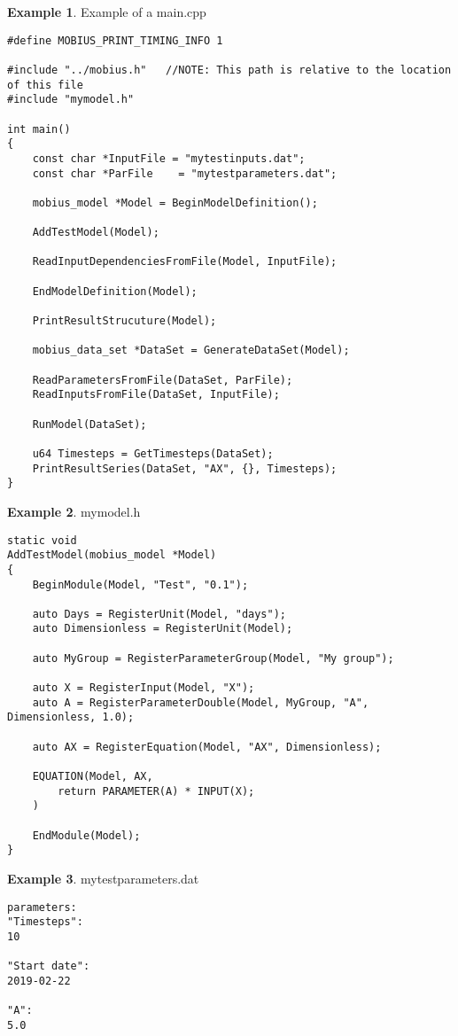 \documentclass[11pt]{article}
\theoremstyle{definition}
\newtheorem{myexample}{Example}
\newenvironment{example}%
  {\begin{lrbox}{\examplebox}%
   \begin{minipage}{\dimexpr\linewidth-2\fboxsep}
   \begin{myexample}}%
  {\end{myexample}%
   \end{minipage}%
   \end{lrbox}%
   \begin{trivlist}
     \item[]\colorbox{silver}{\usebox\examplebox}
   \end{trivlist}}
\begin{document}
\begin{example}\label{ex:examplemain}
Example of a main.cpp
\begin{lstlisting}[style=mycpp]
#define MOBIUS_PRINT_TIMING_INFO 1

#include "../mobius.h"   //NOTE: This path is relative to the location of this file
#include "mymodel.h"

int main()
{
	const char *InputFile = "mytestinputs.dat";
	const char *ParFile    = "mytestparameters.dat";

	mobius_model *Model = BeginModelDefinition();
	
	AddTestModel(Model);
	
	ReadInputDependenciesFromFile(Model, InputFile);

	EndModelDefinition(Model);

	PrintResultStrucuture(Model);

	mobius_data_set *DataSet = GenerateDataSet(Model);

	ReadParametersFromFile(DataSet, ParFile);
	ReadInputsFromFile(DataSet, InputFile);

	RunModel(DataSet);

	u64 Timesteps = GetTimesteps(DataSet);
	PrintResultSeries(DataSet, "AX", {}, Timesteps);
}

\end{lstlisting}
\end{example}

\begin{example}
mymodel.h
\begin{lstlisting}[style=mycpp]
static void
AddTestModel(mobius_model *Model)
{
	BeginModule(Model, "Test", "0.1");

	auto Days = RegisterUnit(Model, "days");
	auto Dimensionless = RegisterUnit(Model);

	auto MyGroup = RegisterParameterGroup(Model, "My group");

	auto X = RegisterInput(Model, "X");
	auto A = RegisterParameterDouble(Model, MyGroup, "A", Dimensionless, 1.0);

	auto AX = RegisterEquation(Model, "AX", Dimensionless);

	EQUATION(Model, AX,
		return PARAMETER(A) * INPUT(X);
	)

	EndModule(Model);
}
\end{lstlisting}
\end{example}

\begin{example}
mytestparameters.dat
\begin{lstlisting}[style=textstyle]
parameters:
"Timesteps":
10

"Start date":
2019-02-22

"A":
5.0
\end{lstlisting}
\end{example}
\end{document}

